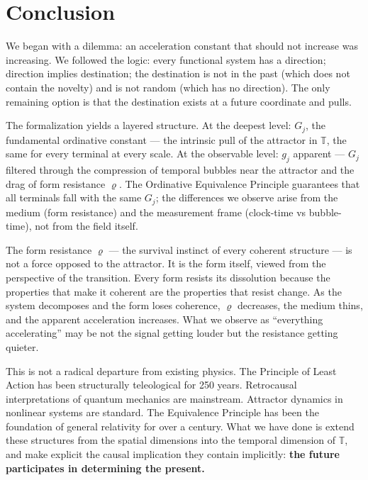 \documentclass[12pt,a4paper]{article}
\newcommand{\tspc}{\mathbb{T}}
\newcommand{\gj}{g_j}
\newcommand{\Gj}{G_j}
\newcommand{\rhof}{\varrho}
\begin{document}
\section{Conclusion}

We began with a dilemma: an acceleration constant that should not increase was increasing. We followed the logic: every functional system has a direction; direction implies destination; the destination is not in the past (which does not contain the novelty) and is not random (which has no direction). The only remaining option is that the destination exists at a future coordinate and pulls.

The formalization yields a layered structure. At the deepest level: $\Gj$, the fundamental ordinative constant --- the intrinsic pull of the attractor in $\tspc$, the same for every terminal at every scale. At the observable level: $\gj$ apparent --- $\Gj$ filtered through the compression of temporal bubbles near the attractor and the drag of form resistance $\rhof$. The Ordinative Equivalence Principle guarantees that all terminals fall with the same $\Gj$; the differences we observe arise from the medium (form resistance) and the measurement frame (clock-time vs bubble-time), not from the field itself.

The form resistance $\rhof$ --- the survival instinct of every coherent structure --- is not a force opposed to the attractor. It is the form itself, viewed from the perspective of the transition. Every form resists its dissolution because the properties that make it coherent are the properties that resist change. As the system decomposes and the form loses coherence, $\rhof$ decreases, the medium thins, and the apparent acceleration increases. What we observe as ``everything accelerating'' may be not the signal getting louder but the resistance getting quieter.

This is not a radical departure from existing physics. The Principle of Least Action has been structurally teleological for 250 years. Retrocausal interpretations of quantum mechanics are mainstream. Attractor dynamics in nonlinear systems are standard. The Equivalence Principle has been the foundation of general relativity for over a century. What we have done is extend these structures from the spatial dimensions into the temporal dimension of $\tspc$, and make explicit the causal implication they contain implicitly: \textbf{the future participates in determining the present.}
\end{document}
